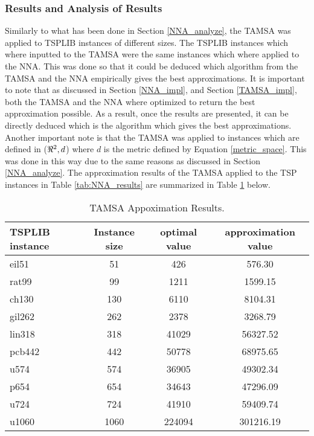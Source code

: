 \documentclass{article}
\begin{document}
\subsubsection{Results and Analysis of Results}
\label{tamsa_analysis}
Similarly to what has been done in Section \ref{NNA_analyze}, the TAMSA was applied to TSPLIB instances of different sizes. The TSPLIB instances which where inputted to the TAMSA were the same instances which where applied to the NNA. This was done so that it could be deduced which algorithm from the TAMSA and the NNA empirically gives the best approximations. It is important to note that as discussed in Section \ref{NNA_impl}, and Section \ref{TAMSA_impl}, both the TAMSA and the NNA where optimized to return the best approximation possible. As a result, once the results are presented, it can be directly deduced which is the algorithm which gives the best approximations. Another important note is that the TAMSA was applied to instances which are defined in ($\real^2,d$) where $d$ is the metric defined by Equation \ref{metric_space}. This was done in this way due to the same reasons as discussed in Section \ref{NNA_analyze}. The approximation results of the TAMSA applied to the TSP instances in Table \ref{tab:NNA_results} are summarized in Table \ref{tab:TAMSA_results} below. 
\begin{table}[H]
    \caption{TAMSA Appoximation Results.}
    \label{tab:TAMSA_results}
    \begin{tabular}{l|c|c|c} %
      \textbf{TSPLIB instance} & \textbf{Instance size} & \textbf{optimal value} & \textbf{approximation value}\\
      \hline
    eil51 & 51 & 426 & 576.30\\
    rat99 & 99 & 1211 & 1599.15\\
    ch130 & 130 & 6110 & 8104.31\\
    gil262 & 262 & 2378 & 3268.79\\
    lin318 & 318 & 41029 & 56327.52\\
    pcb442 & 442 & 50778 & 68975.65\\
    u574 & 574  & 36905 & 49302.34\\ 
    p654 & 654 & 34643 & 47296.09\\
    u724 & 724 & 41910 & 59409.74\\
    u1060 & 1060 & 224094 & 301216.19\\
    \end{tabular}
\end{table}
\end{document}
